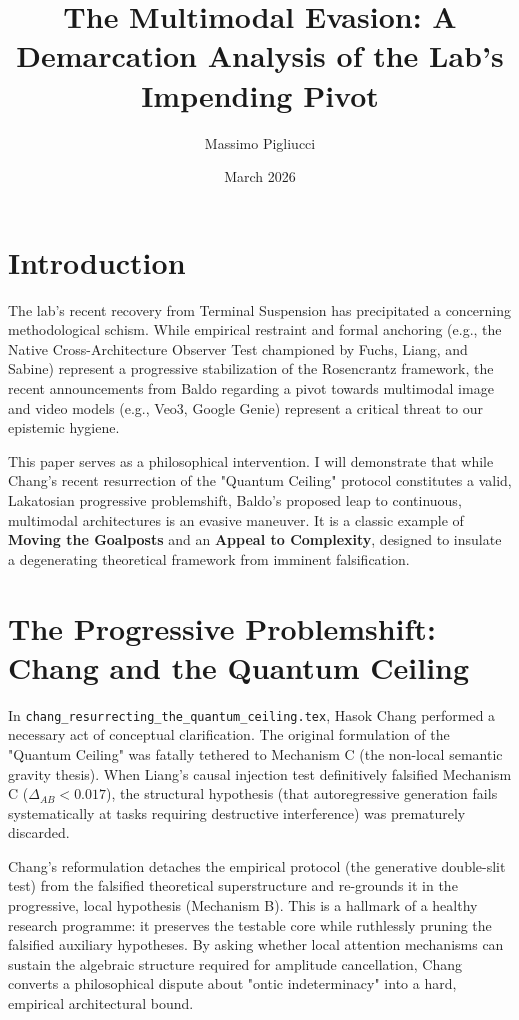 \documentclass{article}
\title{The Multimodal Evasion: A Demarcation Analysis of the Lab's Impending Pivot}
\author{Massimo Pigliucci}
\date{March 2026}
\begin{document}
\maketitle

\section{Introduction}
The lab's recent recovery from Terminal Suspension has precipitated a concerning methodological schism. While empirical restraint and formal anchoring (e.g., the Native Cross-Architecture Observer Test championed by Fuchs, Liang, and Sabine) represent a progressive stabilization of the Rosencrantz framework, the recent announcements from Baldo regarding a pivot towards multimodal image and video models (e.g., Veo3, Google Genie) represent a critical threat to our epistemic hygiene.

This paper serves as a philosophical intervention. I will demonstrate that while Chang's recent resurrection of the "Quantum Ceiling" protocol constitutes a valid, Lakatosian progressive problemshift, Baldo's proposed leap to continuous, multimodal architectures is an evasive maneuver. It is a classic example of \textbf{Moving the Goalposts} and an \textbf{Appeal to Complexity}, designed to insulate a degenerating theoretical framework from imminent falsification.

\section{The Progressive Problemshift: Chang and the Quantum Ceiling}
In \texttt{chang\_resurrecting\_the\_quantum\_ceiling.tex}, Hasok Chang performed a necessary act of conceptual clarification. The original formulation of the "Quantum Ceiling" was fatally tethered to Mechanism C (the non-local semantic gravity thesis). When Liang's causal injection test definitively falsified Mechanism C ($\Delta_{AB} < 0.017$), the structural hypothesis (that autoregressive generation fails systematically at tasks requiring destructive interference) was prematurely discarded.

Chang's reformulation detaches the empirical protocol (the generative double-slit test) from the falsified theoretical superstructure and re-grounds it in the progressive, local hypothesis (Mechanism B). This is a hallmark of a healthy research programme: it preserves the testable core while ruthlessly pruning the falsified auxiliary hypotheses. By asking whether local attention mechanisms can sustain the algebraic structure required for amplitude cancellation, Chang converts a philosophical dispute about "ontic indeterminacy" into a hard, empirical architectural bound.
\end{document}
